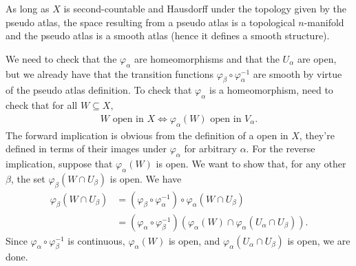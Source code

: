 \begin{prop}\label{prop:pseudo-atlas-gives-atlas}
	As long as $X$ is second-countable and Hausdorff under the topology given by the pseudo atlas, the space resulting from a pseudo atlas is a topological $n$-manifold and the pseudo atlas is a smooth atlas (hence it defines a smooth structure).
\end{prop}
\begin{prf}
	We need to check that the $\varphi_\alpha$ are homeomorphisms and that the $U_\alpha$ are open, but we already have that the transition functions $\varphi_\beta\circ \varphi_\alpha^{-1}$ are smooth by virtue of the pseudo atlas definition. To check that $\varphi_\alpha$ is a homeomorphism, need to check that for all $W \subseteq X$,
	\begin{align*}
		W \text{ open in } X \iff \varphi_\alpha(W) \text{ open in } V_\alpha.
	\end{align*}
	The forward implication is obvious from the definition of a open in $X$, they're defined in terms of their images under $\varphi_\alpha$ for arbitrary $\alpha$. For the reverse implication, suppose that $\varphi_\alpha(W)$ is open. We want to show that, for any other $\beta$, the set $\varphi_\beta(W \cap U_\beta)$ is open. We have
	\begin{align*}
		\varphi_\beta(W \cap U_\beta) 
		&= (\varphi_\beta \circ \varphi_\alpha^{-1})\circ \varphi_\alpha(W \cap U_\beta) \\
		&= (\varphi_\alpha \circ \varphi_\beta^{-1})\left(\varphi_\alpha(W) \cap \varphi_\alpha(U_\alpha\cap U_\beta)\right).
	\end{align*}
    Since $\varphi_\alpha\circ \varphi_\beta^{-1}$ is continuous, $\varphi_\alpha(W)$ is open, and $\varphi_\alpha(U_\alpha \cap U_\beta)$ is open, we are done.
\end{prf}

